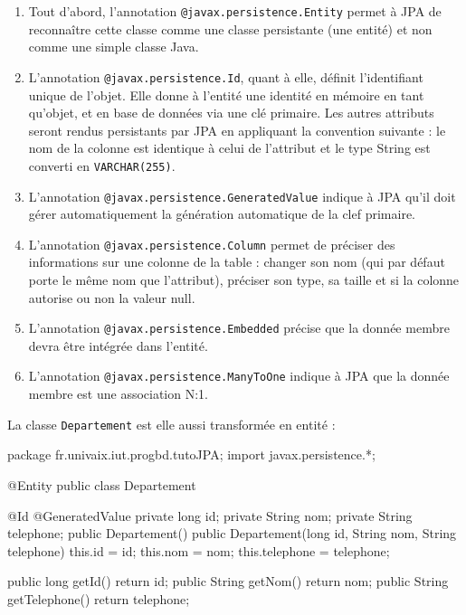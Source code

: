 \documentclass[a4paper,11pt]{article}
\begin{document}
\begin{enumerate}
	\item Tout d'abord, l'annotation \texttt{@javax.persistence.Entity} permet à JPA de reconnaître cette classe comme une 
	classe persistante (une entité) et non comme une simple classe Java.
	\item L'annotation \texttt{@javax.persistence.Id}, quant à elle, définit l'identifiant unique de l'objet. Elle donne à 
	l'entité une identité en mémoire en tant qu'objet, et en base de données via une clé primaire. Les autres attributs 
	seront rendus persistants par JPA en appliquant la convention suivante : le nom de la colonne est identique à celui de 
	l'attribut et le type String est converti en \texttt{VARCHAR(255)}.
	\item L'annotation \texttt{@javax.persistence.GeneratedValue} indique à JPA qu'il doit gérer automatiquement la 
	génération automatique de la clef primaire. 
	\item L'annotation \texttt{@javax.persistence.Column} permet de préciser des informations sur une colonne de la table : 
	changer son nom (qui par défaut porte le même nom que l’attribut), préciser son type, sa taille et si la colonne 
	autorise ou non la valeur null.
	\item L'annotation \texttt{@javax.persistence.Embedded} précise que la donnée membre devra être intégrée dans l'entité. 
	\item L'annotation \texttt{@javax.persistence.ManyToOne} indique à JPA que la donnée membre est une association N:1.
\end{enumerate}

La classe \texttt{Departement} est elle aussi transformée en entité :
\begin{code_java}
package fr.univaix.iut.progbd.tutoJPA;
import javax.persistence.*;

@Entity
public class Departement {
	@Id
	@GeneratedValue
	private long id;
	private String nom;
	private String telephone;
	public Departement() {}
	public Departement(long id, String nom, String telephone) {
		this.id = id;
		this.nom = nom;
		this.telephone = telephone;
	}
	
	public long getId() { return id; }
	public String getNom() { return nom; }
	public String getTelephone() { return telephone; }
}

\end{code_java}
\end{document}

